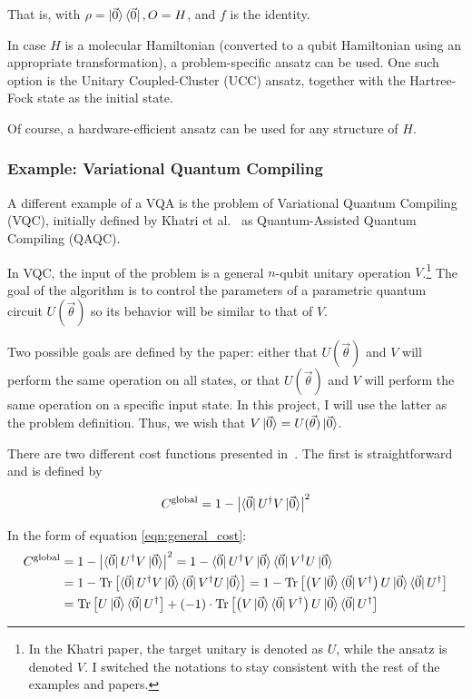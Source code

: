\documentclass[a4paper,12pt]{article}
\newcommand{\thetas}{\vec{\theta}}
\DeclareMathOperator{\tr}{Tr}
\begin{document}
That is, with $\rho = \ket{\vec{0}}\bra{\vec{0}}, O=H$, and $f$ is the identity.

In case $H$ is a molecular Hamiltonian (converted to a qubit Hamiltonian using an appropriate transformation), a problem-specific ansatz can be used. One such option is the Unitary Coupled-Cluster (UCC) ansatz, together with the Hartree-Fock state as the initial state.

Of course, a hardware-efficient ansatz can be used for any structure of $H$.

\subsubsection{Example: Variational Quantum Compiling} \label{subsec:vqc}
A different example of a VQA is the problem of Variational Quantum Compiling (VQC), initially defined by Khatri et al.~\cite{khatri_quantum-assisted_2019} as Quantum-Assisted Quantum Compiling (QAQC).

In VQC, the input of the problem is a general $n$-qubit unitary operation $V$.\footnote{In the Khatri paper, the target unitary is denoted as $U$, while the ansatz is denoted $V$. I switched the notations to stay consistent with the rest of the examples and papers.} The goal of the algorithm is to control the parameters of a parametric quantum circuit $U(\thetas)$ so its behavior will be similar to that of $V$.

Two possible goals are defined by the paper: either that $U(\thetas)$ and $V$ will perform the same operation on all states, or that $U(\thetas)$ and $V$ will perform the same operation on a specific input state.
In this project, I will use the latter as the problem definition. Thus, we wish that $V\ket{\vec{0}} = U(\thetas)\ket{\vec{0}}$.

There are two different cost functions presented in~\cite{khatri_quantum-assisted_2019}.
The first is straightforward and is defined by

\begin{equation}
    C^{\textrm{global}} = 1 - \left|\bra{\vec{0}}U^\dagger V\ket{\vec{0}}\right|^2
\end{equation}

In the form of equation \ref{eqn:general_cost}:
\begin{align*}
    C^{\textrm{global}} &= 1 - \left|\bra{\vec{0}}U^\dagger V\ket{\vec{0}}\right|^2
    = 1 - \bra{\vec{0}}U^\dagger V\ket{\vec{0}}\bra{\vec{0}}V^\dagger U\ket{\vec{0}} \\
    &= 1 - \tr \left[ \bra{\vec{0}}U^\dagger V\ket{\vec{0}}\bra{\vec{0}}V^\dagger U\ket{\vec{0}} \right]
    = 1 - \tr \left[  \left(V\ket{\vec{0}}\bra{\vec{0}}V^\dagger\right) U\ket{\vec{0}} \bra{\vec{0}}U^\dagger \right] \\
    &= \tr \left[ U \ket{\vec{0}}\bra{\vec{0}} U^\dagger \right] + (-1) \cdot \tr \left[  \left(V\ket{\vec{0}}\bra{\vec{0}}V^\dagger\right) U\ket{\vec{0}} \bra{\vec{0}}U^\dagger \right]
\end{align*}
\end{document}
